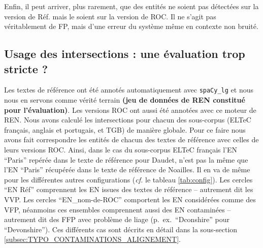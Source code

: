Enfin, il peut arriver, plus rarement, que des entités ne soient pas détectées sur la version de Réf. mais le soient sur la version de ROC. Il ne s'agit pas véritablement de FP, mais d'une erreur du système même en contexte non bruité.


\subsection{Usage des intersections : une évaluation trop stricte ?}
\label{subsec:inter_OCR-IMPACT-NER}
Les textes de référence ont été annotés automatiquement avec \texttt{spaCy\_lg} 
et nous nous en servons comme vérité terrain \textbf{(jeu de données de REN constitué pour l'évaluation)}. Les versions ROC ont aussi été annotées avec ce moteur de REN.
Nous avons calculé les intersections pour chacun des sous-corpus (ELTeC français, anglais et portugais, et TGB) de manière globale. 
Pour ce faire nous avons fait correspondre les entités de chacun des textes de référence avec celles de leurs versions ROC. Ainsi, dans le cas du sous-corpus ELTeC français l'EN ``Paris'' repérée dans le texte de référence pour Daudet, n'est pas la même que l'EN ``Paris'' récupérée dans le texte de référence de Noailles. Il en va de même pour les différentes autres configurations (\textit{cf.} le tableau \ref{tab:config}).
Les cercles ``EN Réf'' comprennent les EN issues des textes de référence -- autrement dit les VVP. Les cercles ``EN\_nom-de-ROC'' comportent les EN considérées comme des VFP, néanmoins ces ensembles comprennent aussi des EN contaminées -- autrement dit des FFP avec problème de liage (p.\ ex.\ ``Dconshire'' pour ``Devonshire''). Ces différents cas sont décrits en détail dans la sous-section \ref{subsec:TYPO_CONTAMINATIONS_ALIGNEMENT}.


